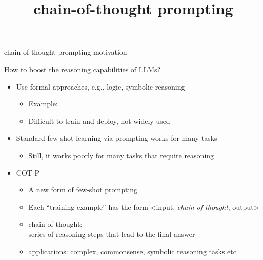 


\usepackage{xspace}



\def\cotpfull{chain-of-thought prompting\xspace}
\def\cotp{COT-P\xspace}

\newcommand{\learninggoals}{
\item illustrate \cotpfull and point out the benefits it brings to LLMs
\item illustrate tree-of-thought and point out the benefits it brings to LLMs 
}

\def\myblue#1{\textcolor{texblue}{#1}}

\title{\cotpfull}
\date{}




\begin{vbframe}{\cotpfull motivation}

\vfill

How to boost the reasoning capabilities of LLMs? 

\begin{itemize}
\item Use formal approaches, e.g., logic, symbolic reasoning
    \begin{itemize}
    \item Example: 
\item Difficult to train and deploy, not widely used
    \end{itemize}
\item Standard few-shot learning via prompting works for many tasks
    \begin{itemize}
    \item Still, it works poorly for many tasks that require reasoning
    \end{itemize}
\item \cotp
    \begin{itemize}
    \item A new form of few-shot prompting
    \item Each ``training example'' has the form <input, \textit{chain of thought}, output>
    \item chain of thought:\\ series of reasoning steps that
    lead to the final answer
    \item applications: complex, commonsense, symbolic
    reasoning tasks etc
    \end{itemize}

\end{itemize}

\vfill

\end{vbframe}

